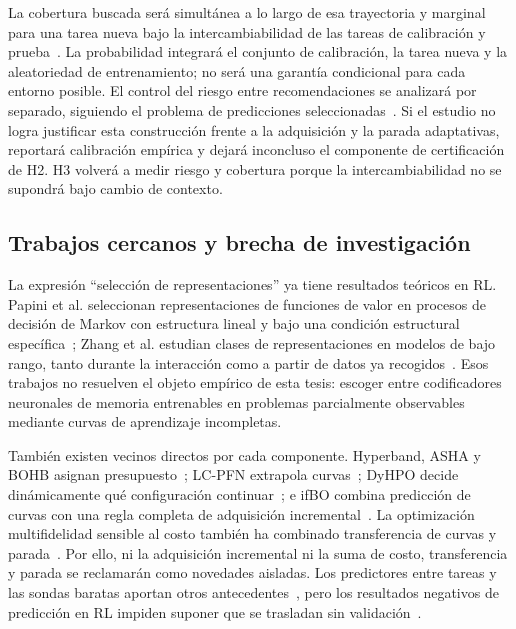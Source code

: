 \documentclass[11pt,letterpaper]{article}
\begin{document}
La cobertura buscada será simultánea a lo largo de esa trayectoria y marginal para una tarea nueva bajo la intercambiabilidad de las tareas de calibración y prueba~\cite{angelopoulos2024crc}.
La probabilidad integrará el conjunto de calibración, la tarea nueva y la aleatoriedad de entrenamiento; no será una garantía condicional para cada entorno posible.
El control del riesgo entre recomendaciones se analizará por separado, siguiendo el problema de predicciones seleccionadas~\cite{xu2025selectivecrc}.
Si el estudio no logra justificar esta construcción frente a la adquisición y la parada adaptativas, reportará calibración empírica y dejará inconcluso el componente de certificación de H2.
H3 volverá a medir riesgo y cobertura porque la intercambiabilidad no se supondrá bajo cambio de contexto.

\subsection{Trabajos cercanos y brecha de investigación}

La expresión \enquote{selección de representaciones} ya tiene resultados teóricos en RL.
Papini et al. seleccionan representaciones de funciones de valor en procesos de decisión de Markov con estructura lineal y bajo una condición estructural específica~\cite{papini2021representation}; Zhang et al. estudian clases de representaciones en modelos de bajo rango, tanto durante la interacción como a partir de datos ya recogidos~\cite{zhang2023representation}.
Esos trabajos no resuelven el objeto empírico de esta tesis: escoger entre codificadores neuronales de memoria entrenables en problemas parcialmente observables mediante curvas de aprendizaje incompletas.

También existen vecinos directos por cada componente.
Hyperband, ASHA y BOHB asignan presupuesto~\cite{li2018hyperband,li2020asha,falkner2018bohb}; LC-PFN extrapola curvas~\cite{adriaensen2023lcpfn}; DyHPO decide dinámicamente qué configuración continuar~\cite{wistuba2022dyhpo}; e ifBO combina predicción de curvas con una regla completa de adquisición incremental~\cite{rakotoarison2024ifbo}.
La optimización multifidelidad sensible al costo también ha combinado transferencia de curvas y parada~\cite{lee2024costsensitive}.
Por ello, ni la adquisición incremental ni la suma de costo, transferencia y parada se reclamarán como novedades aisladas.
Los predictores entre tareas y las sondas baratas aportan otros antecedentes~\cite{abdelfattah2021zerocost,shen2023proxybo,akhauri2023multipredict}, pero los resultados negativos de predicción en RL impiden suponer que se trasladan sin validación~\cite{dierkes2025prediction}.
\end{document}
